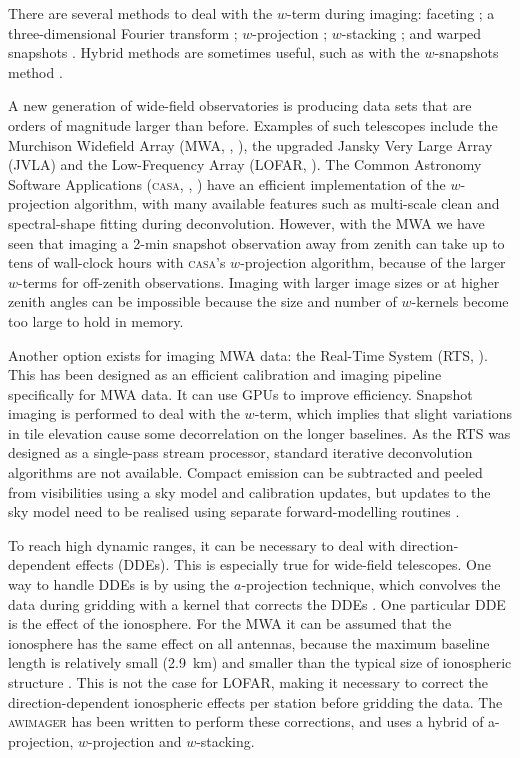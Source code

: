 \documentclass[useAMS,usenatbib]{mn2e}
\begin{document}
There are several methods to deal with the $w$-term during imaging: faceting \citep{facetting-cornwell}; a three-dimensional Fourier transform \citep{perley-noncoplanar-arrays}; $w$-projection \citep{wprojection-cornwell}; $w$-stacking \citep{ska-memo-regridding-2011}; and warped snapshots \citep{perley-noncoplanar-arrays}. Hybrid methods are sometimes useful, such as with the $w$-snapshots method \citep{widefield-imaging-ska-cornwell}.

A new generation of wide-field observatories is producing data sets that are orders of magnitude larger than before. Examples of such telescopes include the Murchison Widefield Array (MWA, \citealt{mwa-design-2009}, \citealt{mwa}), the upgraded Jansky Very Large Array (JVLA) and the Low-Frequency Array (LOFAR, \citealt{lofar-2013}). The Common Astronomy Software Applications (\textsc{casa}, \citealt{casa-2007}, \citealt{casa-2008}) have an efficient implementation of the $w$-projection algorithm, with many available features such as multi-scale clean and spectral-shape fitting during deconvolution. However, with the MWA we have seen that imaging a 2-min snapshot observation away from zenith can take up to tens of wall-clock hours with \textsc{casa}'s $w$-projection algorithm, because of the larger $w$-terms for off-zenith observations. Imaging with larger image sizes or at higher zenith angles can be impossible because the size and number of $w$-kernels become too large to hold in memory.

Another option exists for imaging MWA data: the Real-Time System (RTS, \citealt{rts-mwa,mwa-interferometric-imaging}). This has been designed as an efficient calibration and imaging pipeline specifically for MWA data. It can use GPUs to improve efficiency. Snapshot imaging is performed to deal with the $w$-term, which implies that slight variations in tile elevation cause some decorrelation on the longer baselines. As the RTS was designed as a single-pass stream processor, standard iterative deconvolution algorithms are not available. Compact emission can be subtracted and peeled from visibilities using a sky model and calibration updates, but updates to the sky model need to be realised using separate forward-modelling routines \citep{forward-modelling-bernardi-2011, pindor-subtracting-sources-2011}.

To reach high dynamic ranges, it can be necessary to deal with direction-dependent effects (DDEs). This is especially true for wide-field telescopes. One way to handle DDEs is by using the $a$-projection technique, which convolves the data during gridding with a kernel that corrects the DDEs \citep{aprojection-2008}.
One particular DDE is the effect of the ionosphere. For the MWA it can be assumed that the ionosphere has the same effect on all antennas, because the maximum baseline length is relatively small (2.9~km) and smaller than the typical size of ionospheric structure \citep{lonsdale-calibration-approaches-ionosphere}. This is not the case for LOFAR, making it necessary to correct the direction-dependent ionospheric effects per station before gridding the data. The \textsc{awimager} \citep{awimager-2013} has been written to perform these corrections, and uses a hybrid of a-projection, $w$-projection and $w$-stacking.
\end{document}
